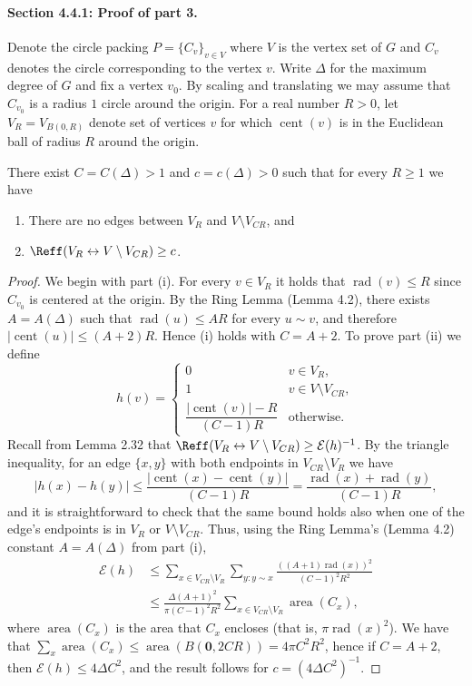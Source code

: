 \paragraph{Section 4.4.1: Proof of part 3.}
Denote the circle packing $P=\{C_v\}_{v\in V}$ where $V$ is the vertex set of $G$ and $C_v$ denotes the circle corresponding to the vertex $v$. Write $\Delta$ for the maximum degree of $G$ and fix a vertex $v_0$. By scaling and translating we may assume that $C_{v_0}$ is a radius $1$ circle around the origin. For a real number $R>0$, let $V_R=V_{B(0,R)}$ denote set of vertices $v$ for which $\operatorname{cent}(v)$ is in the Euclidean ball of radius $R$ around the origin.
\begin{lemma}[4.9]
There exist $C=C(\Delta)>1$ and $c=c(\Delta)>0$ such that for every $R\ge1$ we have
\begin{enumerate}[label=(\roman*)]
\item There are no edges between $V_R$ and $V\setminus V_{CR}$, and
\item $\Reff(V_R\leftrightarrow V\setminus V_{CR})\ge c$.
\end{enumerate}
\end{lemma}
\begin{proof}
We begin with part (i). For every $v\in V_R$ it holds that $\operatorname{rad}(v)\le R$ since $C_{v_0}$ is centered at the origin. By the Ring Lemma (Lemma 4.2), there exists $A=A(\Delta)$ such that $\operatorname{rad}(u)\le AR$ for every $u\sim v$, and therefore $|\operatorname{cent}(u)|\le(A+2)R$. Hence (i) holds with $C=A+2$.
To prove part (ii) we define
\[
h(v)=\begin{cases}
0&v\in V_R,\\1&v\in V\setminus V_{CR},\\
\dfrac{|\operatorname{cent}(v)|-R}{(C-1)R}&\text{otherwise}.
\end{cases}
\]
Recall from Lemma 2.32 that $\Reff(V_R\leftrightarrow V\setminus V_{CR})\ge\mathcal E(h)^{-1}$. By the triangle inequality, for an edge $\{x,y\}$ with both endpoints in $V_{CR}\setminus V_R$ we have
\[
|h(x)-h(y)|\le\frac{|\operatorname{cent}(x)-\operatorname{cent}(y)|}{(C-1)R}
=\frac{\operatorname{rad}(x)+\operatorname{rad}(y)}{(C-1)R},
\]
and it is straightforward to check that the same bound holds also when one of the edge's endpoints is in $V_R$ or $V\setminus V_{CR}$. Thus, using the Ring Lemma's (Lemma 4.2) constant $A=A(\Delta)$ from part (i),
\begin{align*}
\mathcal E(h)
&\le\sum_{x\in V_{CR}\setminus V_R}\sum_{y:y\sim x}
\frac{((A+1)\operatorname{rad}(x))^2}{(C-1)^2R^2}\\
&\le\frac{\Delta(A+1)^2}{\pi(C-1)^2R^2}\sum_{x\in V_{CR}\setminus V_R}\operatorname{area}(C_x),
\end{align*}
where $\operatorname{area}(C_x)$ is the area that $C_x$ encloses (that is, $\pi\operatorname{rad}(x)^2$). We have that $\sum_x\operatorname{area}(C_x)\le\operatorname{area}(B(\mathbf0,2CR))=4\pi C^2R^2$, hence if $C=A+2$, then $\mathcal E(h)\le4\Delta C^2$, and the result follows for $c=(4\Delta C^2)^{-1}$.
\end{proof}
